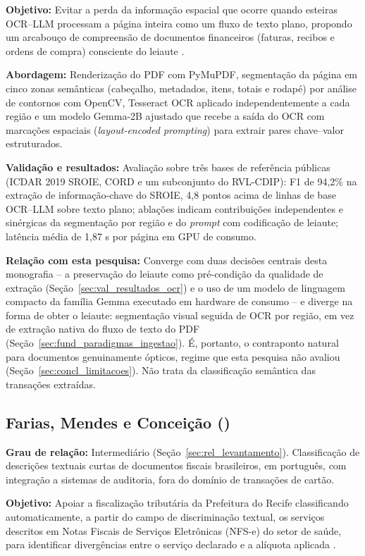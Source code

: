 \textbf{Objetivo:} Evitar a perda da informação espacial que ocorre quando esteiras OCR--LLM processam a página inteira como um fluxo de texto plano, propondo um arcabouço de compreensão de documentos financeiros (faturas, recibos e ordens de compra) consciente do leiaute \cite{gandikota2026spatial}.

\textbf{Abordagem:} Renderização do PDF com PyMuPDF, segmentação da página em cinco zonas semânticas (cabeçalho, metadados, itens, totais e rodapé) por análise de contornos com OpenCV, Tesseract OCR aplicado independentemente a cada região e um modelo Gemma-2B ajustado que recebe a saída do OCR com marcações espaciais (\textit{layout-encoded prompting}) para extrair pares chave--valor estruturados.

\textbf{Validação e resultados:} Avaliação sobre três bases de referência públicas (ICDAR 2019 SROIE, CORD e um subconjunto do RVL-CDIP): F1 de 94,2\% na extração de informação-chave do SROIE, 4,8 pontos acima de linhas de base OCR--LLM sobre texto plano; ablações indicam contribuições independentes e sinérgicas da segmentação por região e do \textit{prompt} com codificação de leiaute; latência média de 1,87 s por página em GPU de consumo.

\textbf{Relação com esta pesquisa:} Converge com duas decisões centrais desta monografia -- a preservação do leiaute como pré-condição da qualidade de extração (Seção~\ref{sec:val_resultados_ocr}) e o uso de um modelo de linguagem compacto da família Gemma executado em hardware de consumo -- e diverge na forma de obter o leiaute: segmentação visual seguida de OCR por região, em vez de extração nativa do fluxo de texto do PDF (Seção~\ref{sec:fund_paradigmas_ingestao}). É, portanto, o contraponto natural para documentos genuinamente ópticos, regime que esta pesquisa não avaliou (Seção~\ref{sec:concl_limitacoes}). Não trata da classificação semântica das transações extraídas.

\subsection{Farias, Mendes e Conceição (\citeyear{farias2025notaconforme})}
\textbf{Grau de relação:} Intermediário (Seção~\ref{sec:rel_levantamento}). Classificação de descrições textuais curtas de documentos fiscais brasileiros, em português, com integração a sistemas de auditoria, fora do domínio de transações de cartão.

\textbf{Objetivo:} Apoiar a fiscalização tributária da Prefeitura do Recife classificando automaticamente, a partir do campo de discriminação textual, os serviços descritos em Notas Fiscais de Serviços Eletrônicas (NFS-e) do setor de saúde, para identificar divergências entre o serviço declarado e a alíquota aplicada \cite{farias2025notaconforme}.


